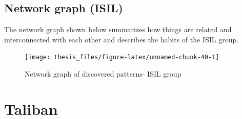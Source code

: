 \documentclass[11pt,oneside,a4paper]{reedthesis}
\begin{document}
\subsection{Network graph (ISIL)}\label{network-graph-isil}

The network graph shown below summarizes how things are related and
interconnected with each other and describes the habits of the ISIL
group.
\begin{figure}
\texttt{[image: thesis\_files/figure-latex/unnamed-chunk-40-1]} \caption{Network graph of discovered patterns- ISIL group}\label{fig:unnamed-chunk-40}
\end{figure}
\section{Taliban}\label{taliban}
\end{document}
